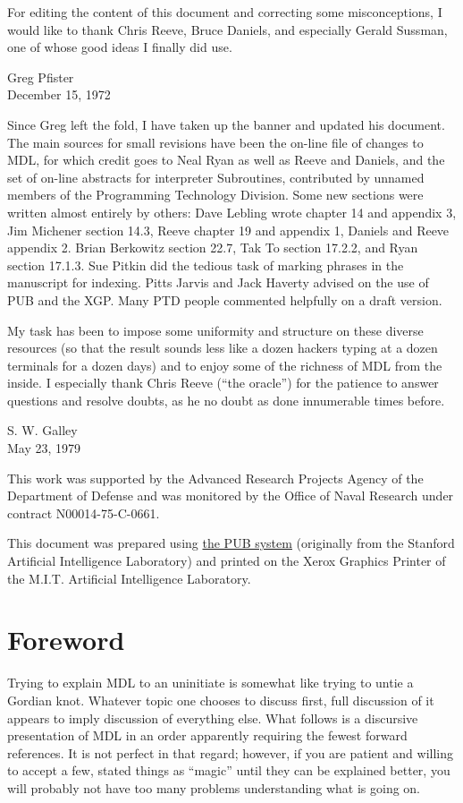 \documentclass[a4paper]{scrbook}
\begin{document}
For editing the content of this document and correcting some misconceptions, I would like to thank Chris Reeve, Bruce
Daniels, and especially Gerald Sussman, one of whose good ideas I finally did use.

Greg Pfister\\
December 15, 1972

Since Greg left the fold, I have taken up the banner and updated his document. The main sources for small revisions have
been the on-line file of changes to MDL, for which credit goes to Neal Ryan as well as Reeve and Daniels, and the set of
on-line abstracts for interpreter Subroutines, contributed by unnamed members of the Programming Technology Division. Some
new sections were written almost entirely by others: Dave Lebling wrote chapter 14 and appendix 3, Jim Michener section
14.3, Reeve chapter 19 and appendix 1, Daniels and Reeve appendix 2. Brian Berkowitz section 22.7, Tak To section 17.2.2,
and Ryan section 17.1.3. Sue Pitkin did the tedious task of marking phrases in the manuscript for indexing. Pitts Jarvis
and Jack Haverty advised on the use of PUB and the XGP. Many PTD people commented helpfully on a draft version.

My task has been to impose some uniformity and structure on these diverse resources (so that the result sounds less like a
dozen hackers typing at a dozen terminals for a dozen days) and to enjoy some of the richness of MDL from the inside. I
especially thank Chris Reeve (``the oracle'') for the patience to answer questions and resolve doubts, as he no doubt as
done innumerable times before.

S. W. Galley\\
May 23, 1979

This work was supported by the Advanced Research Projects Agency of the Department of Defense and was monitored by the
Office of Naval Research under contract N00014-75-C-0661.

This document was prepared using \href{http://www.nomodes.com/pub_manual.html}{the PUB system} (originally from the
Stanford Artificial Intelligence Laboratory) and printed on the Xerox Graphics Printer of the M.I.T. Artificial
Intelligence Laboratory.

\chapter*{Foreword}\label{foreword}


Trying to explain MDL to an uninitiate is somewhat like trying to untie a Gordian knot. Whatever topic one chooses to
discuss first, full discussion of it appears to imply discussion of everything else. What follows is a discursive
presentation of MDL in an order apparently requiring the fewest forward references. It is not perfect in that regard;
however, if you are patient and willing to accept a few, stated things as ``magic'' until they can be explained better, you
will probably not have too many problems understanding what is going on.
\end{document}
